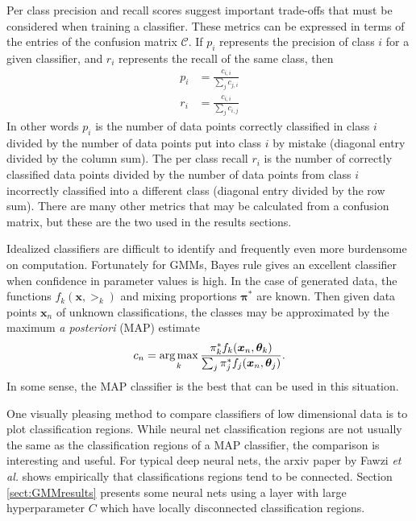 Per class precision and recall scores suggest important trade-offs that must be considered when training a classifier. These metrics can be expressed in terms of the entries of the confusion matrix \( \mathcal{C} \). If \( p_i \) represents the precision of class \( i \) for a given classifier, and \( r_i \) represents the recall of the same class, then 
\begin{align}
p_i &= \frac{c_{i,i}}{\sum_{j} c_{j,i}}\\
r_i &= \frac{c_{i,i}}{\sum_{j} c_{i,j}}
\end{align}
In other words \( p_i \) is the number of data points correctly classified in class \( i \) divided by the number of data points put into class \( i \) by mistake (diagonal entry divided by the column sum). The per class recall \( r_i \) is the number of correctly classified data points divided by the number of data points from class \( i \) incorrectly classified into a different class (diagonal entry divided by the row sum).  There are many other metrics that may be calculated from a confusion matrix, but these are the two used in the results sections.

Idealized classifiers are difficult to identify and frequently even more burdensome on computation.  Fortunately for GMMs, Bayes rule gives an excellent classifier when confidence in parameter values is high. In the case of generated data, the functions \( f_k(\bm x,\bm\gt_k) \) and mixing proportions \( \bm\pi^{\ast} \) are known. Then given data points \( \bm x_n \) of unknown classifications, the classes may be approximated by the maximum \textit{a posteriori} (MAP) estimate
\begin{equation}\label{eqn:MAPestimator}
c_n = \operatorname*{arg\,max}_k \frac{\pi_k^{\ast}f_k(\bm x_n,\bm{\theta}_k)}{\sum_j \pi_j^{\ast}f_j(\bm x_n,\bm{\theta}_j)}. 
\end{equation}
In some sense, the MAP classifier is the best that can be used in this situation.

One visually pleasing method to compare classifiers of low dimensional data is to plot classification regions. While neural net classification regions are not usually the same as the classification regions of a MAP classifier, the comparison is interesting and useful. For typical deep neural nets, the arxiv paper by Fawzi \textit{et al.} \cite{fawzi2017classification} shows empirically that classifications regions tend to be connected.  Section \ref{sect:GMMresults} presents some neural nets using a \RS layer with large hyperparameter \( C \) which have locally disconnected classification regions.

